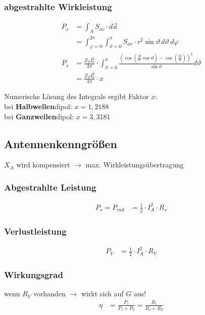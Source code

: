 \subsubsection{abgestrahlte Wirkleistung}
\begin{align*}
	P_{s} & = \int_A S_{av}\cdot d\vec{a}                                                                                                                                                           \\
	      & = \int^{2\pi}_{\varphi = 0}\int^{\pi}_{\vartheta = 0} S_{av}\cdot r^2 \sin\vartheta \, d\vartheta \, d\varphi                                                                           \\
	P_{s} & = \frac{Z_{F}I_0^2}{4\pi}\cdot\int^{\pi}_{\vartheta=0}\frac{\left(\cos\left(\frac{\beta l}{2}\cos\vartheta\right)-\cos\left(\frac{\beta l}{2}\right)\right)^2}{\sin\vartheta}d\vartheta \\
	      & = \frac{Z_{F}I_0^2}{4\pi}\cdot x
\end{align*}

Numerische Lösung des Integrals ergibt Faktor $ x $:\\
bei \textbf{Halbwellen}dipol: $ x=1,2188 $\\
bei \textbf{Ganzwellen}dipol: $ x=3,3181$


\newcolumn
\subsection{Antennenkenngrößen}


$ X_A $ wird kompensiert $ \rightarrow $ max. Wirkleistungsübertragung

\subsubsection{Abgestrahlte Leistung}
\begin{align*}
	P_s = P_{rad} & = \frac{1}{2}\cdot I_A^2 \cdot R_s
\end{align*}

\subsubsection{Verlustleistung}
\begin{align*}
	P_V & = \frac{1}{2}\cdot I_A^2\cdot R_V
\end{align*}

\subsubsection{Wirkungsgrad}
wenn $ R_V $ vorhanden $\rightarrow$ wirkt sich auf $ G $ aus!
\begin{align*}
	\eta & = \frac{P_s}{P_s + P_V} = \frac{R_s}{R_s + R_V}
\end{align*}

